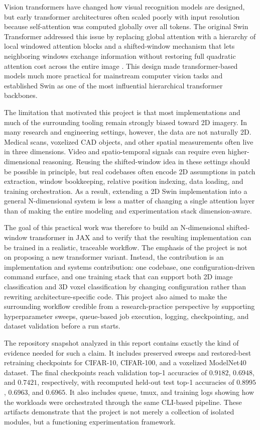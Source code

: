 Vision transformers have changed how visual recognition models are designed, but early transformer architectures often scaled poorly with input resolution because self-attention was computed globally over all tokens. The original Swin Transformer addressed this issue by replacing global attention with a hierarchy of local windowed attention blocks and a shifted-window mechanism that lets neighboring windows exchange information without restoring full quadratic attention cost across the entire image \citep{liu2021swin}. This design made transformer-based models much more practical for mainstream computer vision tasks and established Swin as one of the most influential hierarchical transformer backbones.

The limitation that motivated this project is that most implementations and much of the surrounding tooling remain strongly biased toward 2D imagery. In many research and engineering settings, however, the data are not naturally 2D. Medical scans, voxelized CAD objects, and other spatial measurements often live in three dimensions. Video and spatio-temporal signals can require even higher-dimensional reasoning. Reusing the shifted-window idea in these settings should be possible in principle, but real codebases often encode 2D assumptions in patch extraction, window bookkeeping, relative position indexing, data loading, and training orchestration. As a result, extending a 2D Swin implementation into a general N-dimensional system is less a matter of changing a single attention layer than of making the entire modeling and experimentation stack dimension-aware.

The goal of this practical work was therefore to build an N-dimensional shifted-window transformer in JAX and to verify that the resulting implementation can be trained in a realistic, traceable workflow. The emphasis of the project is not on proposing a new transformer variant. Instead, the contribution is an implementation and systems contribution: one codebase, one configuration-driven command surface, and one training stack that can support both 2D image classification and 3D voxel classification by changing configuration rather than rewriting architecture-specific code. This project also aimed to make the surrounding workflow credible from a research-practice perspective by supporting hyperparameter sweeps, queue-based job execution, logging, checkpointing, and dataset validation before a run starts.

The repository snapshot analyzed in this report contains exactly the kind of evidence needed for such a claim. It includes preserved sweeps and restored-best retraining checkpoints for CIFAR-10, CIFAR-100, and a voxelized ModelNet40 dataset. The final checkpoints reach validation top-1 accuracies of \(0.9182\), \(0.6948\), and \(0.7421\), respectively, with recomputed held-out test top-1 accuracies of \(0.8995\), \(0.6963\), and \(0.6965\). It also includes queue, tmux, and training logs showing how the workloads were orchestrated through the same CLI-based pipeline. These artifacts demonstrate that the project is not merely a collection of isolated modules, but a functioning experimentation framework.

